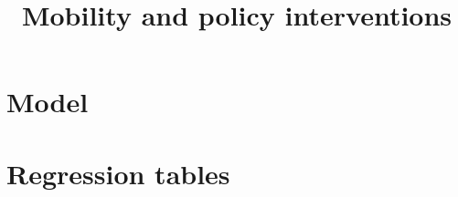 \documentclass{article}
\title{Mobility and policy interventions}
\author{}
\date{}
\begin{document}
\maketitle

\section{Model}

\section{Regression tables}


\end{document}
